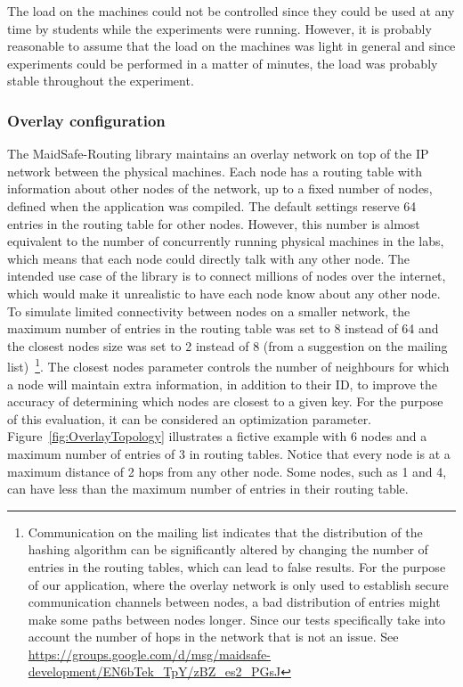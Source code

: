 The load on the machines could not be controlled since they could be used at any time by students while the experiments were running. However, it is probably reasonable to assume that the load on the machines was light in general and since experiments could be performed in a matter of minutes, the load was probably stable throughout the experiment.

\subsubsection{Overlay configuration}
\label{sec:OverlayConfiguration}

The MaidSafe-Routing library maintains an overlay network on top of the IP network between the physical machines. Each node has a routing table with information about other nodes of the network, up to a fixed number of nodes, defined when the application was compiled. The default settings reserve 64 entries in the routing table for other nodes. However, this number is almost equivalent to the number of concurrently running physical machines in the labs, which means that each node could directly talk with any other node. The intended use case of the library is to connect millions of nodes over the internet, which would make it unrealistic to have each node know about any other node. To simulate limited connectivity between nodes on a smaller network, the maximum number of entries in the routing table was set to 8 instead of 64 and the closest nodes size was set to 2 instead of 8 (from a suggestion on the mailing list)~\footnote{Communication on the mailing list indicates that the distribution of the hashing algorithm can be significantly altered by changing the number of entries in the routing tables, which can lead to false results. For the purpose of our application, where the overlay network is only used to establish secure communication channels between nodes, a bad distribution of entries might make some paths between nodes longer. Since our tests specifically take into account the number of hops in the network that is not an issue. See \url{https://groups.google.com/d/msg/maidsafe-development/EN6bTek_TpY/zBZ_es2_PGsJ}}. The closest nodes parameter controls the number of neighbours for which a node will maintain extra information, in addition to their ID, to improve the accuracy of determining which nodes are closest to a given key. For the purpose of this evaluation, it can be considered an optimization parameter. Figure~\ref{fig:OverlayTopology} illustrates a fictive example with 6 nodes and a maximum number of entries of 3 in routing tables. Notice that every node is at a maximum distance of 2 hops from any other node. Some nodes, such as 1 and 4, can have less than the maximum number of entries in their routing table.

